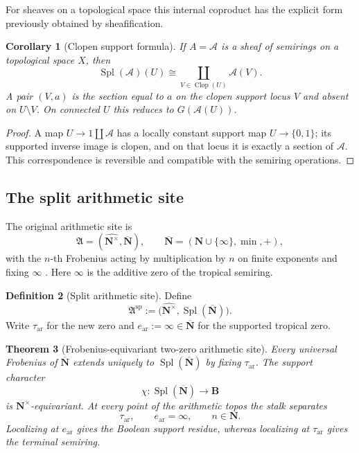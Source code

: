 \documentclass[11pt]{amsart}
\numberwithin{equation}{section}
\newtheorem{theorem}{Theorem}[section]
\newtheorem{corollary}[theorem]{Corollary}
\theoremstyle{definition}
\newtheorem{definition}[theorem]{Definition}
\newcommand{\B}{\mathbf B}
\newcommand{\N}{\mathbf N}
\newcommand{\cA}{\mathcal A}
\newcommand{\Clop}{\operatorname{Clop}}
\newcommand{\Spl}{\operatorname{Spl}}
\newcommand{\Nbar}{\overline{\N}}
\begin{document}
For sheaves on a topological space this internal coproduct has the explicit
form previously obtained by sheafification.

\begin{corollary}[Clopen support formula]
\label{cor:clopen-support-formula}
If $A=\cA$ is a sheaf of semirings on a topological space $X$, then
\[
\Spl(\cA)(U)
\cong
\coprod_{V\in\Clop(U)}\cA(V).
\]
A pair $(V,a)$ is the section equal to $a$ on the clopen support locus $V$
and absent on $U\setminus V$.  On connected $U$ this reduces to
$G(\cA(U))$.
\end{corollary}

\begin{proof}
A map $U\to1\amalg\cA$ has a locally constant support map
$U\to\{0,1\}$; its supported inverse image is clopen, and on that locus it
is exactly a section of $\cA$.  This correspondence is reversible and
compatible with the semiring operations.
\end{proof}

\subsection{The split arithmetic site}

The original arithmetic site is
\[
\mathfrak A=(\widehat{\N^\times},\Nbar),
\qquad
\Nbar=(\N\cup\{\infty\},\min,+),
\]
with the $n$-th Frobenius acting by multiplication by $n$ on finite
exponents and fixing $\infty$ \cite{CCArithmeticSite}.  Here $\infty$ is
the additive zero of the tropical semiring.

\begin{definition}[Split arithmetic site]
\label{def:split-arithmetic-site}
Define
\[
\mathfrak A^{\mathrm{sp}}
:=\bigl(\widehat{\N^\times},\Spl(\Nbar)\bigr).
\]
Write $\tau_{\mathrm{ar}}$ for the new zero and
$e_{\mathrm{ar}}:=\infty\in\Nbar$ for the supported tropical zero.
\end{definition}

\begin{theorem}[Frobenius-equivariant two-zero arithmetic site]
\label{thm:split-arithmetic-site}
Every universal Frobenius of $\Nbar$ extends uniquely to
$\Spl(\Nbar)$ by fixing $\tau_{\mathrm{ar}}$.  The support character
\[
\chi:\Spl(\Nbar)\to\B
\]
is $\N^\times$-equivariant.  At every point of the arithmetic topos the
stalk separates
\[
\tau_{\mathrm{ar}},
\qquad
e_{\mathrm{ar}}=\infty,
\qquad
n\in\N.
\]
Localizing at $e_{\mathrm{ar}}$ gives the Boolean support residue, whereas
localizing at $\tau_{\mathrm{ar}}$ gives the terminal semiring.
\end{theorem}
\end{document}
